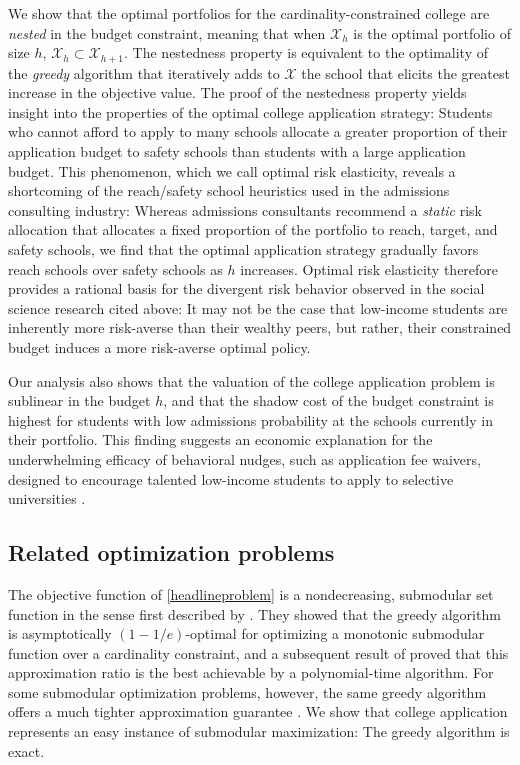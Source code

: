 We show that the optimal portfolios for the cardinality-constrained college are \emph{nested} in the budget constraint, meaning that when $\mathcal{X}_h$ is the optimal portfolio of size $h$, $\mathcal{X}_h \subset \mathcal{X}_{h+1}$. The nestedness property is equivalent to the optimality of the \emph{greedy} algorithm that iteratively adds to $\mathcal{X}$ the school that elicits the greatest increase in the objective value. The proof of the nestedness property yields insight into the properties of the optimal college application strategy: Students who cannot afford to apply to many schools allocate a greater proportion of their application budget to safety schools than students with a large application budget. This phenomenon, which we call optimal risk elasticity, reveals a shortcoming of the reach/safety school heuristics used in the admissions consulting industry: Whereas admissions consultants recommend a \emph{static} risk allocation that allocates a fixed proportion of the portfolio to reach, target, and safety schools, we find that the optimal application strategy gradually favors reach schools over safety schools as $h$ increases. Optimal risk elasticity therefore provides a rational basis for the divergent risk behavior observed in the social science research cited above: It may not be the case that low-income students are inherently more risk-averse than their wealthy peers, but rather, their constrained budget induces a more risk-averse optimal policy. 

Our analysis also shows that the valuation of the college application problem is sublinear in the budget $h$, and that the shadow cost of the budget constraint is highest for students with low admissions probability at the schools currently in their portfolio. This finding suggests an economic explanation for the underwhelming efficacy of behavioral nudges, such as application fee waivers, designed to encourage talented low-income students to apply to selective universities \citep{gurantzetal2021}. 

\subsection{Related optimization problems}

The objective function of \eqref{headlineproblem} is a nondecreasing, submodular set function in the sense first described by \cite{nemhauseretal1978}. They showed that the greedy algorithm is asymptotically $(1 - 1/e)$-optimal for optimizing a monotonic submodular function over a cardinality constraint, and a subsequent result of \cite{nemhauserandwolsey1978} proved that this approximation ratio is the best achievable by a polynomial-time algorithm. For some submodular optimization problems, however, the same greedy algorithm offers a much tighter approximation guarantee \citep{contrerasandfernandez2014}. We show that college application represents an easy instance of submodular maximization: The greedy algorithm is exact.

